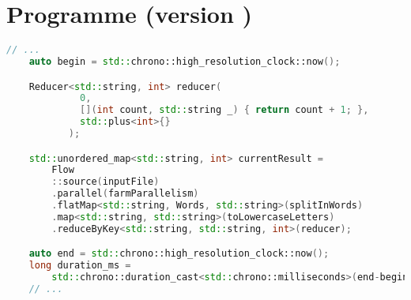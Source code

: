 \newpage
\section{Programme  (version \ppff)}
\begin{lstlisting}[gobble=4,basicstyle=\ttfamily\footnotesize,language=c++]
    // ...
    auto begin = std::chrono::high_resolution_clock::now();

    Reducer<std::string, int> reducer(
             0, 
             [](int count, std::string _) { return count + 1; },
             std::plus<int>{}
           );

    std::unordered_map<std::string, int> currentResult = 
        Flow
        ::source(inputFile)
        .parallel(farmParallelism)
        .flatMap<std::string, Words, std::string>(splitInWords)			
        .map<std::string, std::string>(toLowercaseLetters)			
        .reduceByKey<std::string, std::string, int>(reducer);  

    auto end = std::chrono::high_resolution_clock::now();
    long duration_ms = 
        std::chrono::duration_cast<std::chrono::milliseconds>(end-begin).count();
    // ...
\end{lstlisting}

\newpage
